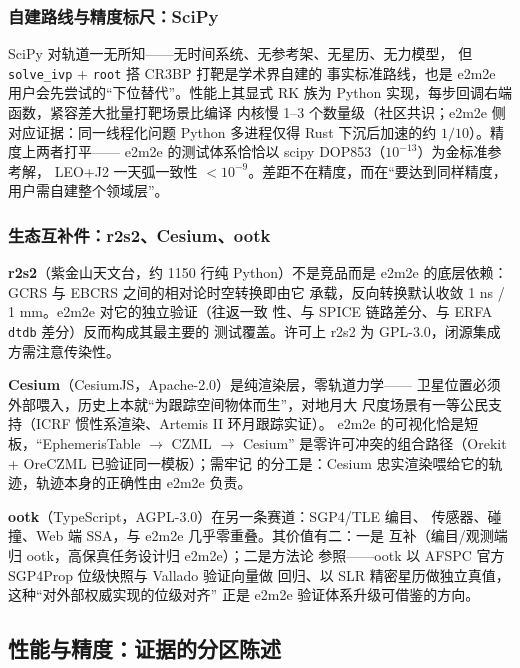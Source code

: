 \subsubsection{自建路线与精度标尺：SciPy}

SciPy 对轨道一无所知——无时间系统、无参考架、无星历、无力模型，
但 \texttt{solve\_ivp} + \texttt{root} 搭 CR3BP 打靶是学术界自建的
事实标准路线，也是 e2m2e 用户会先尝试的``下位替代''。性能上其显式
RK 族为 Python 实现，每步回调右端函数，紧容差大批量打靶场景比编译
内核慢 1--3 个数量级（社区共识；e2m2e 侧对应证据：同一线程化问题
Python 多进程仅得 Rust 下沉后加速的约 $1/10$）。精度上两者打平——
e2m2e 的测试体系恰恰以 scipy DOP853（$10^{-13}$）为金标准参考解，
LEO+J2 一天弧一致性 $<10^{-9}$。差距不在精度，而在``要达到同样精度，
用户需自建整个领域层''。

\subsubsection{生态互补件：r2s2、Cesium、ootk}

\textbf{r2s2}（紫金山天文台，约 1150 行纯 Python）不是竞品而是
e2m2e 的底层依赖：GCRS 与 EBCRS 之间的相对论时空转换即由它
承载，反向转换默认收敛 1 ns / 1 mm。e2m2e 对它的独立验证（往返一致
性、与 SPICE 链路差分、与 ERFA \texttt{dtdb} 差分）反而构成其最主要的
测试覆盖。许可上 r2s2 为 GPL-3.0，闭源集成方需注意传染性。

\textbf{Cesium}（CesiumJS，Apache-2.0）是纯渲染层，零轨道力学——
卫星位置必须外部喂入，历史上本就``为跟踪空间物体而生''，对地月大
尺度场景有一等公民支持（ICRF 惯性系渲染、Artemis II 环月跟踪实证）。
e2m2e 的可视化恰是短板，``EphemerisTable $\to$ CZML $\to$ Cesium''
是零许可冲突的组合路径（Orekit + OreCZML 已验证同一模板）；需牢记
的分工是：Cesium 忠实渲染喂给它的轨迹，轨迹本身的正确性由 e2m2e
负责。

\textbf{ootk}（TypeScript，AGPL-3.0）在另一条赛道：SGP4/TLE 编目、
传感器、碰撞、Web 端 SSA，与 e2m2e 几乎零重叠。其价值有二：一是
互补（编目/观测端归 ootk，高保真任务设计归 e2m2e）；二是方法论
参照——ootk 以 AFSPC 官方 SGP4Prop 位级快照与 Vallado 验证向量做
回归、以 SLR 精密星历做独立真值，这种``对外部权威实现的位级对齐''
正是 e2m2e 验证体系升级可借鉴的方向。

\subsection{性能与精度：证据的分区陈述}

